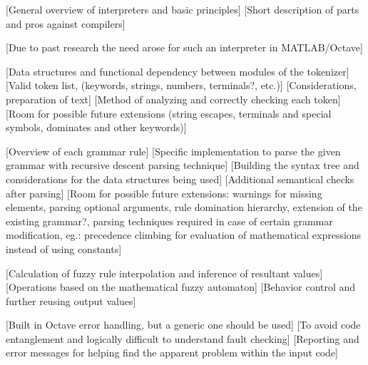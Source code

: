 
[General overview of interpreters and basic principles]
[Short description of parts and pros against compilers]

[Due to past research the need arose for such an interpreter in MATLAB/Octave]

[Data structures and functional dependency between modules of the tokenizer]
[Valid token list, (keywords, strings, numbers, terminals?, etc.)]
[Considerations, preparation of text]
[Method of analyzing and correctly checking each token]
[Room for possible future extensions (string escapes, terminals and special symbols, dominates and other keywords)]

[Overview of each grammar rule]
[Specific implementation to parse the given grammar with recursive descent parsing technique]
[Building the syntax tree and considerations for the data structures being used]
[Additional semantical checks after parsing]
[Room for possible future extensions: warnings for missing elements, parsing optional arguments, rule domination hierarchy, extension of the existing grammar?, parsing techniques required in case of certain grammar modification, eg.: precedence climbing for evaluation of mathematical expressions instead of  using constants]

[Calculation of fuzzy rule interpolation and inference of resultant values]
[Operations based on the mathematical fuzzy automaton]
[Behavior control and further reusing output values]

[Built in Octave error handling, but a generic one should be used]
[To avoid code entanglement and logically difficult to understand fault checking]
[Reporting and error messages for helping find the apparent problem within the input code]